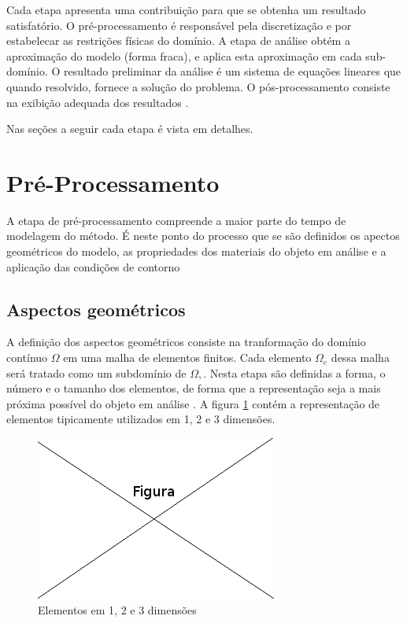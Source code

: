 \documentclass[
    12pt,               %
    openright,          %
    oneside,
    a4paper,            %
    english,            %
    french,             %
    spanish,            %
    brazil              %
    ]{abntex2}
\begin{document}
Cada etapa apresenta uma contribuição para que se obtenha um resultado satisfatório. O pré-processamento é responsável pela discretização e por estabelecar as restrições físicas do domínio. A etapa de análise obtém a aproximação do modelo (forma fraca), e aplica esta aproximação em cada sub-domínio. O resultado preliminar da análise é um sistema de equações lineares que quando resolvido, fornece a solução do problema.  O pós-processamento consiste na exibição adequada dos resultados \cite[p. 665, 666]{zien}.


Nas seções a seguir cada etapa é vista em detalhes.

\section{Pré-Processamento}
\label{sec:preProc}

A etapa de pré-processamento compreende a maior parte do tempo de modelagem do método. É neste ponto do processo que se são definidos os apectos geométricos do modelo, as propriedades dos materiais do objeto em análise e a aplicação das condições de contorno \cite[p. 9, 665]{zien}

\subsection{Aspectos geométricos} 
A definição dos aspectos geométricos consiste na tranformação do domínio contínuo $\Omega$ em uma malha de elementos finitos. Cada elemento $\Omega_e$ dessa malha será tratado como um subdomínio de $\Omega,$.  
Nesta etapa são definidas a forma, o número e o tamanho dos elementos, de forma que a representação seja a mais próxima possível do objeto em análise \cite[p. 154]{desai}.
A figura \ref{fig:elementos} contém a representação de elementos tipicamente utilizados em 1, 2 e 3 dimensões. 

\begin{figure}[!htb]
\centering
\includegraphics[scale=0.5]{figuras/temp.png}
\caption{Elementos em 1, 2 e 3 dimensões}
\label{fig:elementos}
\end{figure}
\end{document}
